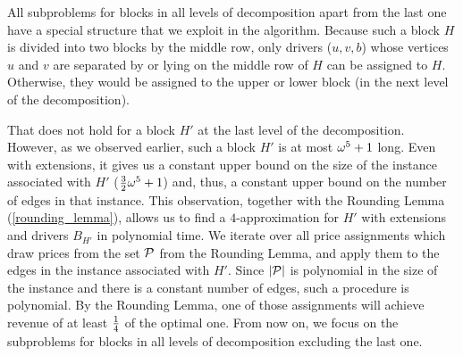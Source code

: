 All subproblems for blocks in all levels of decomposition apart from the last one
have a special structure that we exploit in the algorithm.
Because such a block $H$ is divided into two blocks by the middle row,
only drivers ($u, v, b$) whose vertices $u$ and $v$ are separated by or lying on the middle row of $H$ can be assigned to $H$.
Otherwise, they would be assigned to the upper or lower block (in the next level of the decomposition).

That does not hold for a block $H'$ at the last level of the decomposition.
However, as we observed earlier, such a block $H'$ is at most $\omega^5 + 1$ long.
Even with extensions, it gives us a constant upper bound on the size of the instance associated with $H'$
($\frac{3}{2} \omega^5 + 1$)
and, thus, a constant upper bound on the number of edges in that instance.
This observation, together with the Rounding Lemma (\cref{rounding_lemma}), allows us to
find a $4$-approximation for $H'$ with extensions and drivers $B_{H'}$ in polynomial time.
We iterate over all price assignments which draw prices from the set $\mathcal{P}$ from the Rounding Lemma,
and apply them to the edges in the instance associated with $H'$.
Since $\left| \mathcal{P} \right|$ is polynomial in the size of the instance and there is a constant number of edges,
such a procedure is polynomial.
By the Rounding Lemma, one of those assignments will achieve revenue of at least $\frac{1}{4}$ of the optimal one.
From now on, we focus on the subproblems for blocks in all levels of decomposition excluding the last one.
